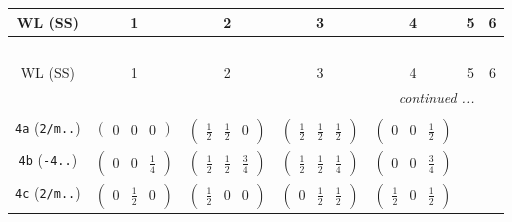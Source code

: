\documentclass[fleqn,9pt,landscape]{jsarticle}
\begin{document}
\begin{center}
\renewcommand{\arraystretch}{1.2}
\begin{longtable}{ccccccc}
 \hline \hline
WL (SS) & 1 & 2 & 3 & 4 & 5 & 6 \\ \hline \endfirsthead

\multicolumn{6}{l}{\tablename\ \thetable{}} \\
 \hline \hline
WL (SS) & 1 & 2 & 3 & 4 & 5 & 6 \\ \hline \endhead

 \hline \hline
\multicolumn{6}{r}{\footnotesize\it continued ...} \\ \endfoot

 \hline \hline
\multicolumn{6}{r}{} \\ \endlastfoot

{\tt 4a} ({\tt 2/m..}) & $ \begin{pmatrix} 0 & 0 & 0 \end{pmatrix} $ & $ \begin{pmatrix} \frac{1}{2} & \frac{1}{2} & 0 \end{pmatrix} $ & $ \begin{pmatrix} \frac{1}{2} & \frac{1}{2} & \frac{1}{2} \end{pmatrix} $ & $ \begin{pmatrix} 0 & 0 & \frac{1}{2} \end{pmatrix} $ & $  $ & $  $ \\ \hline
{\tt 4b} ({\tt -4..}) & $ \begin{pmatrix} 0 & 0 & \frac{1}{4} \end{pmatrix} $ & $ \begin{pmatrix} \frac{1}{2} & \frac{1}{2} & \frac{3}{4} \end{pmatrix} $ & $ \begin{pmatrix} \frac{1}{2} & \frac{1}{2} & \frac{1}{4} \end{pmatrix} $ & $ \begin{pmatrix} 0 & 0 & \frac{3}{4} \end{pmatrix} $ & $  $ & $  $ \\ \hline
{\tt 4c} ({\tt 2/m..}) & $ \begin{pmatrix} 0 & \frac{1}{2} & 0 \end{pmatrix} $ & $ \begin{pmatrix} \frac{1}{2} & 0 & 0 \end{pmatrix} $ & $ \begin{pmatrix} 0 & \frac{1}{2} & \frac{1}{2} \end{pmatrix} $ & $ \begin{pmatrix} \frac{1}{2} & 0 & \frac{1}{2} \end{pmatrix} $ & $  $ & $  $ \\ \hline

\end{longtable}
\end{center}
\end{document}

